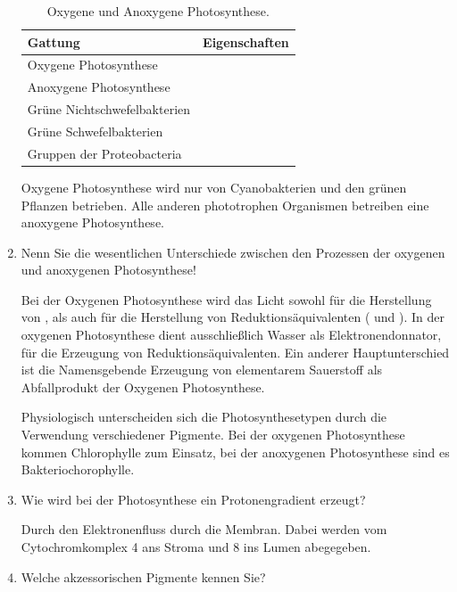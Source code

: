 \begin{enumerate}
		\begin{table}[h!]
		\begin{center}
		\begin{tabular}{l l} 
		\toprule	
		Gattung			&	Eigenschaften 						\\
		\midrule
		\multicolumn{2}{l}{Oxygene Photosynthese}			\\
		\midrule
		\multicolumn{2}{l}{Anoxygene Photosynthese}		\\
		Grüne Nichtschwefelbakterien 	& 	\\
		Grüne Schwefelbakterien			&	\\
		Gruppen der Proteobacteria		&	\\
		\bottomrule
		\end{tabular}
		\caption{Oxygene und Anoxygene Photosynthese.}
		\label{tab:AnOxPs}
		\end{center}
		\end{table}

		Oxygene Photosynthese wird nur von Cyanobakterien und den grünen Pflanzen betrieben.
		Alle anderen phototrophen Organismen betreiben eine anoxygene Photosynthese.

	
	\item Nenn Sie die wesentlichen Unterschiede zwischen den Prozessen der oxygenen und anoxygenen Photosynthese!

		Bei der Oxygenen Photosynthese wird das Licht sowohl für die Herstellung von ,
		als auch für die Herstellung von Reduktionsäquivalenten ( und ).
		In der oxygenen Photosynthese dient ausschließlich Wasser als Elektronendonnator,
		für die Erzeugung von Reduktionsäquivalenten.
		Ein anderer Hauptunterschied ist die Namensgebende Erzeugung von elementarem
		Sauerstoff als Abfallprodukt der Oxygenen Photosynthese.
	
		Physiologisch unterscheiden sich die Photosynthesetypen durch die Verwendung
		verschiedener Pigmente.
		Bei der oxygenen Photosynthese kommen Chlorophylle zum Einsatz,
		bei der anoxygenen Photosynthese sind es Bakteriochorophylle.

	\item Wie wird bei der Photosynthese ein Protonengradient erzeugt?

		Durch den Elektronenfluss durch die Membran.
		Dabei werden vom Cytochromkomplex 4  ans Stroma und 8  ins Lumen abegegeben.

	\item Welche akzessorischen Pigmente kennen Sie? 


\end{enumerate}
